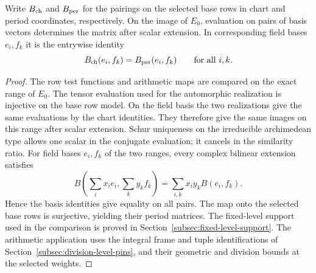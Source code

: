 \begin{lemma}
Write \(B_{\rm ch}\) and \(B_{\rm per}\) for the pairings on the selected base rows in chart and period coordinates, respectively. On the image of \(E_0\), evaluation on pairs of basis vectors determines the matrix after scalar extension. In corresponding field bases \(e_i,f_k\) it is the entrywise identity
\[
 B_{\rm ch}(e_i,f_k)=B_{\rm per}(e_i,f_k)\qquad\text{for all }i,k.
\]

\end{lemma}
\begin{proof}
The row test functions and arithmetic maps are compared
on the exact range of \(E_0\). The tensor evaluation used for
the automorphic realization is injective on the base row model.
On the field basis the two realizations give the same
evaluations by the chart identities. They therefore give the
same images on this range after scalar extension. Schur
uniqueness on the irreducible archimedean type allows one scalar
in the conjugate evaluation; it cancels in the similarity ratio.
For field bases \(e_i,f_k\) of the two ranges, every complex
bilinear extension satisfies
\[
 B\left(\sum_i x_ie_i,\sum_k y_k f_k\right)=\sum_{i,k}x_iy_k B(e_i,f_k).
\]
Hence the basis identities give equality on all pairs. The map
onto the selected base rows is surjective, yielding their period
matrices. The fixed-level support used in
the comparison is proved in Section~\ref{subsec:fixed-level-support}.
The arithmetic application uses the integral frame and tuple
identifications of Section~\ref{subsec:division-level-pins},
and their geometric and division bounds at the selected weights.
\end{proof}
